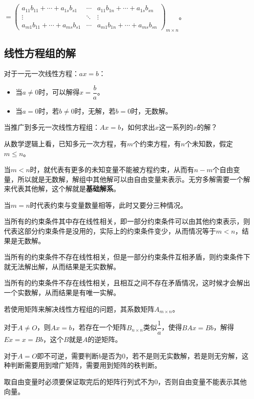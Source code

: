 \documentclass[UTF8, 12pt]{ctexart}
\begin{document}
$=\left(\begin{array}{ccc}
    a_{11}b_{11}+\cdots+a_{1s}b_{s1} & \cdots & a_{11}b_{1n}+\cdots+a_{1s}b_{sn} \\
    \vdots & \ddots & \vdots \\
    a_{m1}b_{11}+\cdots+a_{ms}b_{s1} & \cdots & a_{m1}b_{1n}+\cdots+a_{ms}b_{sn}
\end{array}\right)_{m\times n}\text{。}$

\subsection{线性方程组的解}

对于一元一次线性方程：$ax=b$：

\begin{itemize}
    \item 当$a\neq 0$时，可以解得$x=\dfrac{b}{a}$。
    \item 当$a=0$时，若$b\neq 0$时，无解，若$b=0$时，无数解。
\end{itemize}

当推广到多元一次线性方程组：$Ax=b$，如何求出$x$这一系列的$x$的解？

从数学逻辑上看，已知多元一次方程，有$m$个约束方程，有$n$个未知数，假定$m\leqslant n$。

当$m<n$时，就代表有更多的未知变量不能被方程约束，从而有$n-m$个自由变量，所以就是无数解，解组中其他解可以由自由变量来表示。无穷多解需要一个解来代表其他解，这个解就是\textbf{基础解系}。

当$m=n$时代表约束与变量数量相等，此时又要分三种情况。

当所有的约束条件其中存在线性相关，即一部分约束条件可以由其他约束表示，则代表这部分约束条件是没用的，实际上的约束条件变少，从而情况等于$m<n$，结果是无数解。

当所有的约束条件不存在线性相关，但是一部分约束条件互相矛盾，则约束条件下就无法解出解，从而结果是无实数解。

当所有的约束条件不存在线性相关，且相互之间不存在矛盾情况，这时候才会解出一个实数解，从而结果是有唯一实解。

若使用矩阵来解决线性方程组的问题，其系数矩阵$A_{m\times n}$。

对于$A\neq O$，则$Ax=b$，若存在一个矩阵$B_{n\times n}$类似$\dfrac{1}{a}$，使得$BAx=Bb$，解得$Ex=x=Bb$，这个$B$就是$A$的逆矩阵。

对于$A=O$即不可逆，需要判断$b$是否为0，若不是则无实数解，若是则无穷解，这种判断需要用到增广矩阵，需要用到矩阵的秩判断。

取自由变量时必须要保证取完后的矩阵行列式不为0，否则自由变量不能表示其他向量。
\end{document}
